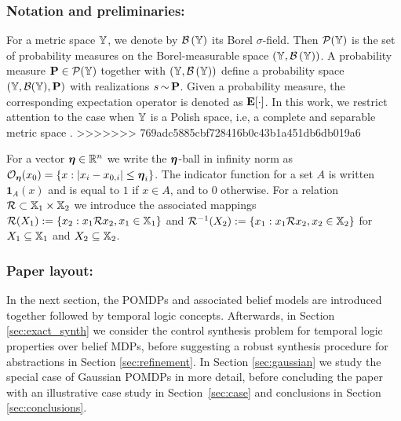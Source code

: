 \documentclass{ifacconf}
\newcommand{\new}[1]{{\color{blue}#1}}
\newcommand{\ind}{\mathbf{1}}
\begin{document}
\subsubsection{Notation and preliminaries:}

For a metric space ${\mathbb{Y}}$, we denote by $\mathcal{B}\left({\mathbb{Y}}\right)$ its Borel $\sigma$-field. Then $\mathcal P({\mathbb{Y}})$ is the set of probability measures on the Borel-measurable space $({\mathbb{Y}},\mathcal{B}\left({\mathbb{Y}}\right))$. A probability measure $\mathbf{P} \in \mathcal P({\mathbb{Y}})$ together with $({\mathbb{Y}},\mathcal{B}\left({\mathbb{Y}}\right))$ define a probability space $({\mathbb{Y}},\mathcal{B}({\mathbb{Y}}),\mathbf{P})$ with realizations $s{\,\sim\,}\mathbf{P}$. Given a probability measure, the corresponding expectation operator is denoted as $\mathbf{E}[\cdot]$. \new{In this work, we restrict attention to the case when ${\mathbb{Y}}$ is a Polish space, i.e, a complete and separable metric space \citep{bogachev2007measure}.}
>>>>>>> 769adc5885cbf728416b0c43b1a451db6db019a6

For a vector ${\boldsymbol{\eta}}  \in \mathbb{R}^n$ we write the ${\boldsymbol{\eta}}$-ball in infinity norm as $\mathcal{O}_{\boldsymbol{\eta}}(x_0) = \{ x : |x_i - x_{0,i}| \leq {\boldsymbol{\eta}}_i \}$. The indicator function for a set $A$ is written $\ind_A(x)$ and is equal to $1$ if $x \in A$, and to 0 otherwise. For a relation $\mathcal{R} \subset {\mathbb{X}}_1 \times {\mathbb{X}}_2$ we introduce the associated mappings $\mathcal{R}(X_1):=\{x_2: x_1\mathcal{R} x_2, x_1 \in {\mathbb{X}}_1\}$ and  $\mathcal{R}^{-1}( X_2 ):=\{x_1: x_1\mathcal{R} x_2, x_2 \in {\mathbb{X}}_2 \}$ for $X_1 \subseteq {\mathbb{X}}_1$ and $X_2 \subseteq {\mathbb{X}}_2$.


\subsubsection{Paper layout:}

In the next section, the POMDPs and associated belief models are introduced together followed by temporal logic concepts. Afterwards, in Section \ref{sec:exact_synth} we consider the control synthesis problem for temporal logic properties over belief MDPs, before suggesting a robust synthesis procedure for abstractions in Section \ref{sec:refinement}. In Section \ref{sec:gaussian} we study the special case of Gaussian POMDPs in more detail, before concluding the paper with an illustrative case study in Section~\ref{sec:case} and conclusions in Section \ref{sec:conclusions}.
\end{document}

